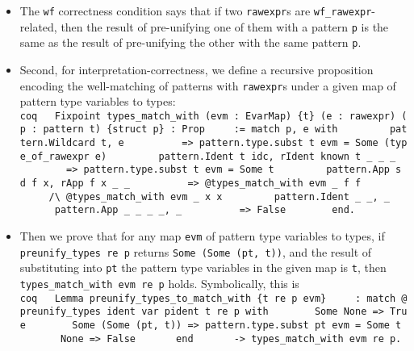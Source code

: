 \begin{itemize}
\begin{itemize}
    \begin{itemize}
    \tightlist
    \item
      The \texttt{wf} correctness condition says that if two
      \texttt{rawexpr}s are \texttt{wf\_rawexpr}-related, then the
      result of pre-unifying one of them with a pattern \texttt{p} is
      the same as the result of pre-unifying the other with the same
      pattern \texttt{p}.
    \item
      Second, for interpretation-correctness, we define a recursive
      proposition encoding the well-matching of patterns with
      \texttt{rawexpr}s under a given map of pattern type variables to
      types:
      \texttt{coq\ \ \ Fixpoint\ types\_match\_with\ (evm\ :\ EvarMap)\ \{t\}\ (e\ :\ rawexpr)\ (p\ :\ pattern\ t)\ \{struct\ p\}\ :\ Prop\ \ \ ~\ :=\ match\ p,\ e\ with\ \ \ ~\ ~\ ~\textbar{}\ pattern.Wildcard\ t,\ e\ \ \ ~\ ~\ ~\ ~=\textgreater{}\ pattern.type.subst\ t\ evm\ =\ Some\ (type\_of\_rawexpr\ e)\ \ \ ~\ ~\ ~\textbar{}\ pattern.Ident\ t\ idc,\ rIdent\ known\ t\textquotesingle{}\ \_\ \_\ \_\ \ \ ~\ ~\ ~\ ~=\textgreater{}\ pattern.type.subst\ t\ evm\ =\ Some\ t\textquotesingle{}\ \ \ ~\ ~\ ~\textbar{}\ pattern.App\ s\ d\ f\ x,\ rApp\ f\textquotesingle{}\ x\textquotesingle{}\ \_\ \_\ \ \ ~\ ~\ ~\ ~=\textgreater{}\ @types\_match\_with\ evm\ \_\ f\textquotesingle{}\ f\ \ \ ~\ ~\ ~\ ~\ ~\ /\textbackslash{}\ @types\_match\_with\ evm\ \_\ x\textquotesingle{}\ x\ \ \ ~\ ~\ ~\textbar{}\ pattern.Ident\ \_\ \_,\ \_\ \ \ ~\ ~\ ~\textbar{}\ pattern.App\ \_\ \_\ \_\ \_,\ \_\ \ \ ~\ ~\ ~\ ~=\textgreater{}\ False\ \ \ ~\ ~\ ~end.}
    \item
      Then we prove that for any map \texttt{evm} of pattern type
      variables to types, if \texttt{preunify\_types\ re\ p} returns
      \texttt{Some\ (Some\ (pt,\ t\textquotesingle{}))}, and the result
      of substituting into \texttt{pt} the pattern type variables in the
      given map is \texttt{t\textquotesingle{}}, then
      \texttt{types\_match\_with\ evm\ re\ p} holds. Symbolically, this
      is
      \texttt{coq\ \ \ Lemma\ preunify\_types\_to\_match\_with\ \{t\ re\ p\ evm\}\ \ \ ~\ :\ match\ @preunify\_types\ ident\ var\ pident\ t\ re\ p\ with\ \ \ ~\ ~\ \textbar{}\ Some\ None\ =\textgreater{}\ True\ \ \ ~\ ~\ \textbar{}\ Some\ (Some\ (pt,\ t\textquotesingle{}))\ =\textgreater{}\ pattern.type.subst\ pt\ evm\ =\ Some\ t\textquotesingle{}\ \ \ ~\ ~\ \textbar{}\ None\ =\textgreater{}\ False\ \ \ ~\ ~\ end\ \ \ ~\ ~\ -\textgreater{}\ types\_match\_with\ evm\ re\ p.}
    \end{itemize}

\end{itemize}
\end{itemize}
